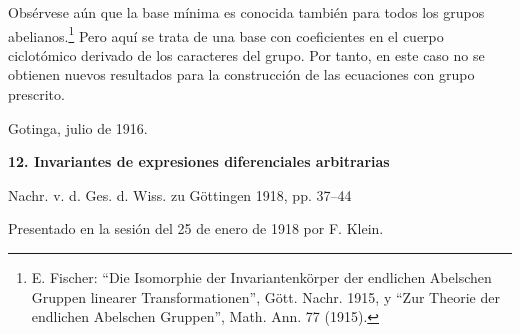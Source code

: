 \documentclass[11pt]{article}
\begin{document}
Obsérvese aún que la base mínima es conocida también para todos los grupos abelianos.\footnote{E. Fischer: ``Die Isomorphie der Invariantenkörper der endlichen Abelschen Gruppen linearer Transformationen'', Gött. Nachr. 1915, y ``Zur Theorie der endlichen Abelschen Gruppen'', Math. Ann. 77 (1915).} Pero aquí se trata de una base con coeficientes en el cuerpo ciclotómico derivado de los caracteres del grupo. Por tanto, en este caso no se obtienen nuevos resultados para la construcción de las ecuaciones con grupo prescrito.

\medskip
\noindent Gotinga, julio de 1916.

\clearpage

\begin{center}
{\Large\bfseries 12. Invariantes de expresiones diferenciales arbitrarias}\par
\vspace{1.5em}
Nachr. v. d. Ges. d. Wiss. zu Göttingen 1918, pp. 37--44
\end{center}

\vspace{3em}
\begin{center}
Presentado en la sesión del 25 de enero de 1918 por F. Klein.
\end{center}
\end{document}
